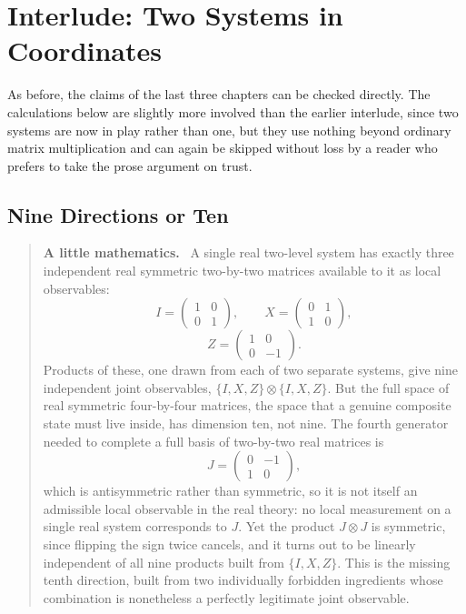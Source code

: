 \documentclass[12pt,openany]{book}
\newenvironment{lowmath}{\begin{quote}\small\noindent\textbf{A little mathematics.}\ }{\end{quote}}
\begin{document}
\chapter{Interlude: Two Systems in Coordinates}

As before, the claims of the last three chapters can be checked directly. The calculations below are slightly more involved than the earlier interlude, since two systems are now in play rather than one, but they use nothing beyond ordinary matrix multiplication and can again be skipped without loss by a reader who prefers to take the prose argument on trust.

\section{Nine Directions or Ten}

\begin{lowmath}
A single real two-level system has exactly three independent real symmetric two-by-two matrices available to it as local observables:
\[
I=\begin{pmatrix}1&0\\0&1\end{pmatrix},\qquad
X=\begin{pmatrix}0&1\\1&0\end{pmatrix},
\]
\[
Z=\begin{pmatrix}1&0\\0&-1\end{pmatrix}.
\]
Products of these, one drawn from each of two separate systems, give nine independent joint observables, $\{I,X,Z\}\otimes\{I,X,Z\}$. But the full space of real symmetric four-by-four matrices, the space that a genuine composite state must live inside, has dimension ten, not nine. The fourth generator needed to complete a full basis of two-by-two real matrices is
\[
J=\begin{pmatrix}0&-1\\1&0\end{pmatrix},
\]
which is antisymmetric rather than symmetric, so it is not itself an admissible local observable in the real theory: no local measurement on a single real system corresponds to $J$. Yet the product $J\otimes J$ is symmetric, since flipping the sign twice cancels, and it turns out to be linearly independent of all nine products built from $\{I,X,Z\}$. This is the missing tenth direction, built from two individually forbidden ingredients whose combination is nonetheless a perfectly legitimate joint observable.
\end{lowmath}
\end{document}
